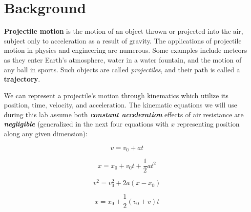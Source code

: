 
\iffalse
\labChapter{M}{Simple Projectile Motion with Kinematics}
\else
{}
\fi
\label{lab:M3}






\section{Background}


\textbf{Projectile motion} is the motion of an object thrown or projected into the air, subject only to acceleration as a result of gravity. The applications of projectile motion in physics and engineering are numerous. Some examples include meteors as they enter Earth’s atmosphere, water in a water fountain, and the motion of any ball in sports. Such objects are called \textit{projectiles}, and their path is called a \textbf{trajectory}. 

We can represent a projectile's motion through kinematics which utilize its position, time, velocity, and acceleration. The kinematic equations we will use during this lab assume both \textbf{\textit{constant acceleration}} effects of air resistance are \textbf{\textit{negligible}} (generalized in the next four equations with $x$ representing position along any given dimension):

 \begin{equation}
  \label{eq:M03Kinematic_01}
  v = v_{0} + at
\end{equation}


 \begin{equation}
  \label{eq:M03Kinematic_02}
  x = x_{0} + v_{0}t + \frac{1}{2}at^{2}
\end{equation}


 \begin{equation}
  \label{eq:M03Kinematic_03}
  v^{2} = v_{0}^{2} + 2a(x - x_{0})
\end{equation}

 \begin{equation}
  \label{eq:M03Kinematic_04}
  x = x_{0} + \frac{1}{2}(v_{0} + v)t
\end{equation}



